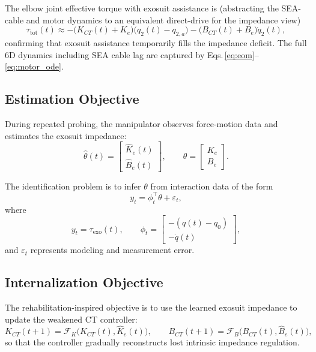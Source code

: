 \documentclass[11pt]{article}
\begin{document}
The elbow joint effective torque with exosuit assistance is (abstracting the SEA-cable and motor dynamics to an equivalent direct-drive for the impedance view)
\begin{equation}
    \tau_{\mathrm{tot}}(t) \approx
    -\bigl(K_{CT}(t)+K_e\bigr)\bigl(q_2(t)-q_{2,a}\bigr)
    -\bigl(B_{CT}(t)+B_e\bigr)\dot{q}_2(t),
    \label{eq:total_torque}
\end{equation}
confirming that exosuit assistance temporarily fills the impedance deficit.  The full 6D dynamics including SEA cable lag are captured by Eqs.\,\eqref{eq:eom}--\eqref{eq:motor_ode}.

\subsection{Estimation Objective}

During repeated probing, the manipulator observes force-motion data and estimates the exosuit impedance:
\begin{equation}
\hat{\theta}(t) =
\begin{bmatrix}
\hat{K}_e(t) \\
\hat{B}_e(t)
\end{bmatrix},
\qquad
\theta =
\begin{bmatrix}
K_e \\
B_e
\end{bmatrix}.
\end{equation}

The identification problem is to infer \(\theta\) from interaction data of the form
\begin{equation}
y_t = \phi_t^\top \theta + \varepsilon_t,
\end{equation}
where
\begin{equation}
y_t = \tau_{\mathrm{exo}}(t),
\qquad
\phi_t =
\begin{bmatrix}
-(q(t)-q_0) \\
-\dot{q}(t)
\end{bmatrix},
\end{equation}
and \(\varepsilon_t\) represents modeling and measurement error.

\subsection{Internalization Objective}

The rehabilitation-inspired objective is to use the learned exosuit impedance to update the weakened CT controller:
\begin{equation}
K_{CT}(t+1) = \mathcal{F}_K\bigl(K_{CT}(t), \hat{K}_e(t)\bigr),
\qquad
B_{CT}(t+1) = \mathcal{F}_B\bigl(B_{CT}(t), \hat{B}_e(t)\bigr),
\label{eq:generic_update}
\end{equation}
so that the controller gradually reconstructs lost intrinsic impedance regulation. 
\end{document}
